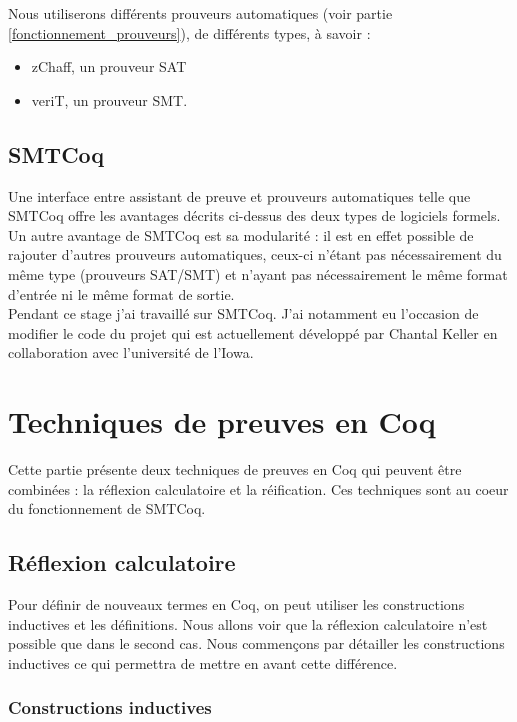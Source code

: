 \documentclass[11pt]{article}
\begin{document}
Nous utiliserons différents prouveurs automatiques (voir partie \ref{fonctionnement_prouveurs}), de différents types, à savoir : 
\begin{itemize}
    \item zChaff, un prouveur SAT
    \item veriT, un prouveur SMT.
\end{itemize}


\subsection{SMTCoq}

Une interface entre assistant de preuve et prouveurs automatiques telle que SMTCoq offre les avantages décrits ci-dessus des deux types de logiciels formels. Un autre avantage de SMTCoq est sa modularité : il est en effet possible de rajouter d'autres prouveurs automatiques, ceux-ci n'étant pas nécessairement du même type (prouveurs SAT/SMT) et n'ayant pas nécessairement le même format d'entrée ni le même format de sortie. \\

Pendant ce stage j'ai travaillé sur SMTCoq. J'ai notamment eu l'occasion de modifier le code du projet qui est actuellement développé par Chantal Keller en collaboration avec l'université de l'Iowa. 



\newpage

\section{Techniques de preuves en Coq} \label{coq}

Cette partie présente deux techniques de preuves en Coq qui peuvent être combinées : la réflexion calculatoire et la réification. Ces techniques sont au coeur du fonctionnement de SMTCoq.


\subsection{Réflexion calculatoire}

Pour définir de nouveaux termes en Coq, on peut utiliser les constructions inductives et les définitions. Nous allons voir que la réflexion calculatoire n'est possible que dans le second cas. Nous commençons par détailler les constructions inductives ce qui permettra de mettre en avant cette différence.

\subsubsection{Constructions inductives}
\end{document}
